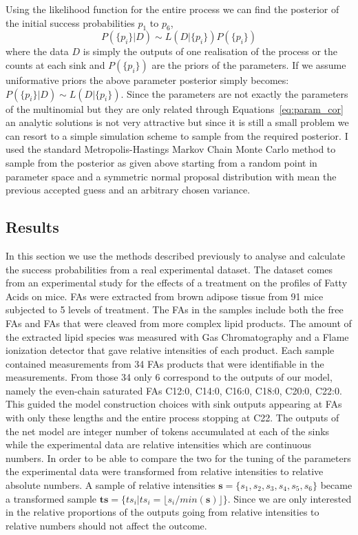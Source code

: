 Using the likelihood function for the entire process we can find the
posterior of the initial success probabilities $p_1$ to $p_6$,
\begin{equation*}
P(\{p_i\} | D) \sim L(D | \{p_i\}) P(\{p_i\})
\end{equation*}
where the data $D$ is simply the outputs of one realisation of the
process or the counts at each sink and $P(\{p_i\})$ are the priors of
the parameters. If we assume uniformative priors the above parameter
posterior simply becomes: $P(\{p_i\} | D) \sim L(D | \{p_i\})$. Since
the parameters are not exactly the parameters of the multinomial but
they are only related through Equations~\ref{eq:param_cor} an analytic
solutions is not very attractive but since it is still a small problem
we can resort to a simple simulation scheme to sample from the required
posterior. I used the standard Metropolis-Hastings Markov Chain Monte Carlo method to
sample from the posterior as given above starting from a random point
in parameter space and a symmetric normal proposal distribution with
mean the previous accepted guess and an arbitrary chosen variance.


\subsection{Results}
In this section we use the methods described previously to analyse and
calculate the success probabilities from a real experimental
dataset. The dataset comes from an experimental study for the effects
of a treatment on the profiles of Fatty Acids on mice. FAs
were extracted from brown adipose tissue from 91 mice subjected to 5
levels of treatment. The FAs in the samples include both the free FAs
and FAs that were cleaved from more complex lipid products. The amount
of the extracted lipid species was measured with Gas Chromatography
and a Flame ionization detector that gave relative intensities of each
product. Each sample contained measurements from 34 FAs products that
were identifiable in the measurements. From those 34 only 6 correspond
to the outputs of our model, namely the even-chain saturated FAs
C12:0, C14:0, C16:0, C18:0, C20:0, C22:0. This guided the model
construction choices with sink outputs appearing at FAs with only these
lengths and the entire process stopping at C22. The outputs of the net model are integer number of tokens accumulated
at each of the sinks while the experimental
data are relative intensities which are continuous numbers. In order
to be able to compare the two for the tuning of the parameters the
experimental data were transformed from relative intensities to
relative absolute numbers. A sample of relative
intensities $\mathbf{s} = \{s_1, s_2, s_3, s_4, s_5, s_6\}$ became a
transformed sample $\mathbf{ts} = \{ ts_i | ts_i = \lfloor s_i /
min(\mathbf{s}) \rfloor \}$.
 Since we are only interested in the
relative proportions of the outputs going from relative intensities to
relative numbers should not affect the outcome.


